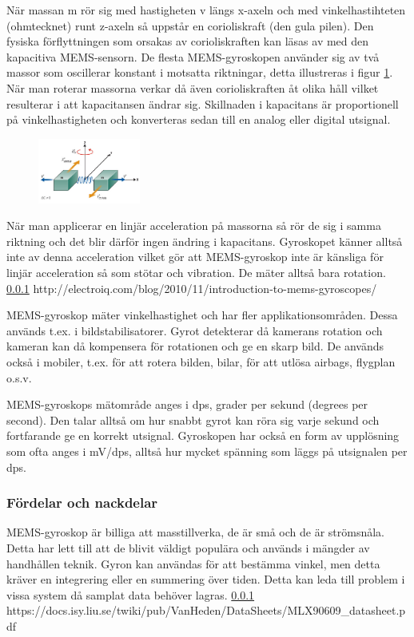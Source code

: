\documentclass[a4paper,12pt,fleqn]{article}
\begin{document}
När massan m rör sig med hastigheten v längs x-axeln och med vinkelhastihteten (ohmtecknet) runt z-axeln så uppstår en corioliskraft (den gula pilen). Den fysiska förflyttningen som orsakas av corioliskraften kan läsas av med den kapacitiva MEMS-sensorn. De flesta MEMS-gyroskopen använder sig av två massor som oscillerar konstant i motsatta riktningar, detta illustreras i figur \ref{fig:angular}. När man roterar massorna verkar då även corioliskraften åt olika håll vilket resulterar i att kapacitansen ändrar sig. Skillnaden i kapacitans är proportionell på vinkelhastigheten och konverteras sedan till en analog eller digital utsignal.

\begin{figure}[h]
\label{fig:angular}
\caption{}
\includegraphics[width=0.3\textwidth]
{angularv.png}
\end{figure}

När man applicerar en linjär acceleration på massorna så rör de sig i samma riktning och det blir därför ingen ändring i kapacitans. Gyroskopet känner alltså inte av denna acceleration vilket gör att MEMS-gyroskop inte är känsliga för linjär acceleration så som stötar och vibration. De mäter alltså bara rotation.
\ref{} http://electroiq.com/blog/2010/11/introduction-to-mems-gyroscopes/


MEMS-gyroskop mäter vinkelhastighet och har fler applikationsområden. Dessa används t.ex. i bildstabilisatorer. Gyrot detekterar då kamerans rotation och kameran kan då kompensera för rotationen och ge en skarp bild. De används också i mobiler, t.ex. för att rotera bilden, bilar, för att utlösa airbags, flygplan o.s.v.

MEMS-gyroskops mätområde anges i dps, grader per sekund (degrees per second). Den talar alltså om hur snabbt gyrot kan röra sig varje sekund och fortfarande ge en korrekt utsignal. Gyroskopen har också en form av upplösning som ofta anges i mV/dps, alltså hur mycket spänning som läggs på utsignalen per dps.

\subsubsection{Fördelar och nackdelar}
MEMS-gyroskop är billiga att masstillverka, de är små och de är strömsnåla. Detta har lett till att de blivit väldigt populära och används i mängder av handhållen teknik.
Gyron kan användas för att bestämma vinkel, men detta kräver en integrering eller en summering över tiden. Detta kan leda till problem i vissa system då samplat data behöver lagras.
\ref{} https://docs.isy.liu.se/twiki/pub/VanHeden/DataSheets/MLX90609_datasheet.pdf
\end{document}
